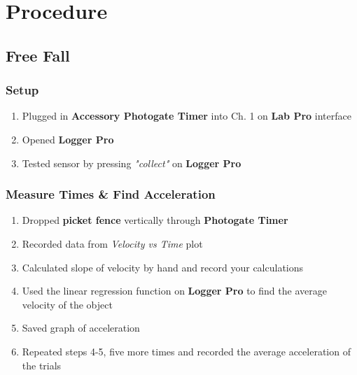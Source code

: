 
\section{Procedure}
\vspace{-0.5cm}
\singlespacing



\subsection{Free Fall}

\subsubsection{Setup}

	\begin{enumerate}

		\item Plugged in \textbf{Accessory Photogate Timer} into Ch. 1 on \textbf{Lab Pro} interface
		\item Opened \textbf{Logger Pro}
			
		\item Tested sensor by pressing \textit{"collect"} on \textbf{Logger Pro}
	\end{enumerate}	

\subsubsection{Measure Times \& Find Acceleration}
	\begin{enumerate}[resume]

		\item Dropped \textbf{picket fence} vertically through \textbf{Photogate Timer}
	
		\item Recorded data from \textit{Velocity vs Time} plot

		\item Calculated slope of velocity by hand and record your calculations

		\item Used the linear regression function on \textbf{Logger Pro} to find the average velocity of the object

		\item Saved graph of acceleration

		\item Repeated steps 4-5, five more times and recorded the average acceleration of the trials
	\end{enumerate}

